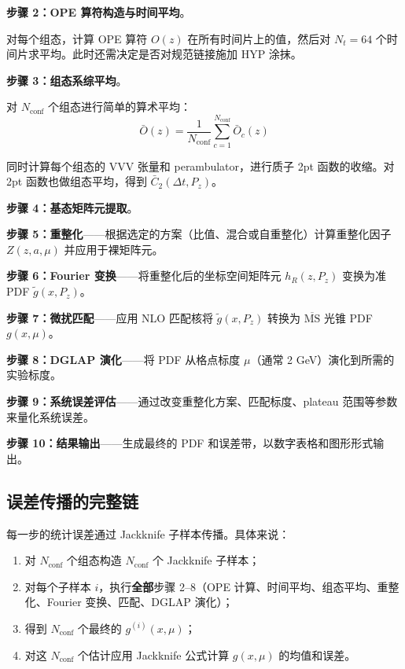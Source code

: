 \documentclass[11pt,a4paper]{ctexart}
\begin{document}
\textbf{步骤 2：OPE 算符构造与时间平均}。

对每个组态，计算 OPE 算符 $O(z)$ 在所有时间片上的值，然后对 $N_t = 64$ 个时间片求平均。此时还需决定是否对规范链接施加 HYP 涂抹。

\textbf{步骤 3：组态系综平均}。

对 $N_{\text{conf}}$ 个组态进行简单的算术平均：
\begin{equation}
\bar{O}(z) = \frac{1}{N_{\text{conf}}} \sum_{c=1}^{N_{\text{conf}}} \bar{O}_c(z)
\end{equation}

同时计算每个组态的 VVV 张量和 perambulator，进行质子 2pt 函数的收缩。对 2pt 函数也做组态平均，得到 $\bar{C}_2(\Delta t, P_z)$。

\textbf{步骤 4：基态矩阵元提取}。

\textbf{步骤 5：重整化}——根据选定的方案（比值、混合或自重整化）计算重整化因子 $Z(z, a, \mu)$ 并应用于裸矩阵元。

\textbf{步骤 6：Fourier 变换}——将重整化后的坐标空间矩阵元 $h_R(z, P_z)$ 变换为准 PDF $\tilde{g}(x, P_z)$。

\textbf{步骤 7：微扰匹配}——应用 NLO 匹配核将 $\tilde{g}(x, P_z)$ 转换为 $\overline{\text{MS}}$ 光锥 PDF $g(x, \mu)$。

\textbf{步骤 8：DGLAP 演化}——将 PDF 从格点标度 $\mu$（通常 2 GeV）演化到所需的实验标度。

\textbf{步骤 9：系统误差评估}——通过改变重整化方案、匹配标度、plateau 范围等参数来量化系统误差。

\textbf{步骤 10：结果输出}——生成最终的 PDF 和误差带，以数字表格和图形形式输出。

\subsection{误差传播的完整链}

每一步的统计误差通过 Jackknife 子样本传播。具体来说：
\begin{enumerate}
  \item 对 $N_{\text{conf}}$ 个组态构造 $N_{\text{conf}}$ 个 Jackknife 子样本；
  \item 对每个子样本 $i$，执行\textbf{全部}步骤 2--8（OPE 计算、时间平均、组态平均、重整化、Fourier 变换、匹配、DGLAP 演化）；
  \item 得到 $N_{\text{conf}}$ 个最终的 $g^{(i)}(x, \mu)$；
  \item 对这 $N_{\text{conf}}$ 个估计应用 Jackknife 公式计算 $g(x, \mu)$ 的均值和误差。
\end{enumerate}
\end{document}
